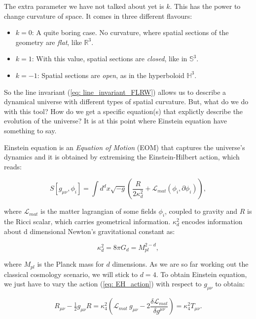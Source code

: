 \documentclass[11pt, a4paper]{article} %
\renewcommand{\it}{\textit}
\begin{document}
The extra parameter we have not talked about yet is $k$. This has the power to change curvature of space. It comes in three different flavours:

\begin{itemize}
	\item $k = 0$: A quite boring case. No curvature, where spatial sections of the geometry are \it{flat}, like $\mathbb{R}^{3}$.
	\item $k = 1$: With this value, spatial sections are \it{closed}, like in $\mathbb{S}^{3}$.
	\item $k = -1$: Spatial sections are \it{open}, as in the hyperboloid $\mathbb{H}^{3}$.
\end{itemize}

So the line invariant (\ref{eq: line_invariant_FLRW}) allows us to describe a dynamical universe with different types of spatial curvature. But, what do we do with this tool? How do we get a specific equation(s) that explictly describe the evolution of the universe? It is at this point where Einstein equation have something to say. 

Einstein equation is an \textit{Equation of Motion} (EOM) that captures the universe's dynamics and it is obtained by extremising the Einstein-Hilbert action, which reads:

\begin{equation}\label{eq: EH_action}
	S[g_{\mu\nu}, \phi_{i}] = \int d^{d}x \sqrt{-g} \left(\frac{R}{2 \kappa^{2}_{d}} + \mathcal{L}_{mat}(\phi_{i}, \partial \phi_{i})\right), 
\end{equation}

where $\mathcal{L}_{mat}$ is the matter lagrangian of some fields $\phi_{i}$, coupled to gravity and $R$ is the Ricci scalar, which carries geometrical information. $\kappa^{2}_{d}$ encodes information about d dimensional Newton's gravitational constant as:

\begin{equation}
	\kappa^{2}_{d} = 8 \pi G_{d} = M_{pl}^{2-d},
\end{equation}

where $M_{pl}$ is the Planck mass for $d$ dimensions. As we are so far working out the classical cosmology scenario, we will stick to $d = 4$. To obtain Einstein equation, we just have to vary the action (\ref{eq: EH_action}) with respect to $g_{\mu \nu}$ to obtain:

\begin{equation}\label{eq: Einstein}
		R_{\mu\nu} - \tfrac{1}{2} g_{\mu\nu} R = \kappa^{2}_{4} \left(\mathcal{L}_{mat}\: g_{\mu\nu} - 2 \frac{\delta \mathcal{L}_{mat}}{\delta g^{\mu \nu}}\right) = \kappa^{2}_{4} T_{\mu \nu}.
\end{equation}
\end{document}
